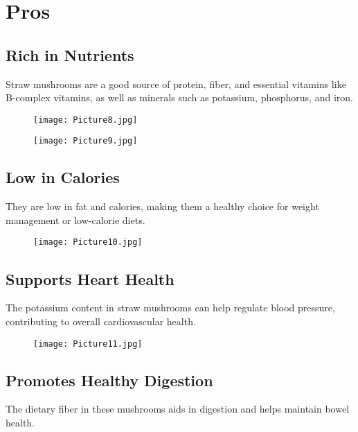 \chapter{Pros}
\fontsize{16pt}{16pt}\normalfont %

\section{Rich in Nutrients}
Straw mushrooms are a good source of protein, fiber, and essential vitamins like B-complex vitamins, as well as minerals such as potassium, phosphorus, and iron.

\begin{figure}[htbp]
\centering
\begin{minipage}{0.39\textwidth}
    \texttt{[image: Picture8.jpg]}
\end{minipage}\hfill
\begin{minipage}{0.39\textwidth}
    \texttt{[image: Picture9.jpg]}
\end{minipage}
\end{figure}

\section{Low in Calories}
They are low in fat and calories, making them a healthy choice for weight management or low-calorie diets.
\begin{figure}[htbp]
    \centering
    \texttt{[image: Picture10.jpg]}
\end{figure}

\section{Supports Heart Health}
The potassium content in straw mushrooms can help regulate blood pressure, contributing to overall cardiovascular health.

\begin{figure}[htbp]
    \centering
    \texttt{[image: Picture11.jpg]}
\end{figure}

\section{Promotes Healthy Digestion}
The dietary fiber in these mushrooms aids in digestion and helps maintain bowel health.

